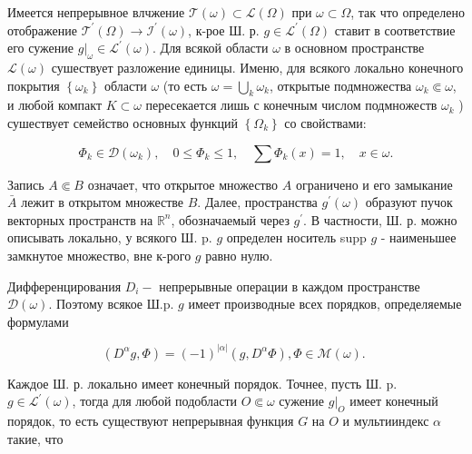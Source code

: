 \documentclass[10pt]{article}
\begin{document}
Имеется непрерывное влчжение $\mathscr{T}(\omega) \subset \mathscr{L}(\Omega)$ при $\omega \subset \Omega$, так что определено отображение $\mathscr{T}^{\prime}(\Omega) \rightarrow \mathscr{I}^{\prime}(\omega)$, к-рое Ш. р. $g \in \mathscr{L}^{\prime}(\Omega)$ ставит в соответствие его сужение $\left.g\right|_{\omega} \in \mathscr{L}^{\prime}(\omega)$. Для всякой области $\omega$ в основном пространстве $\mathscr{L}(\omega)$ сушествует разложение единицы. Именю, для всякого локально конечного покрытия $\left\{\omega_{k}\right\}$ области $\omega$ (то есть $\omega=\bigcup_{k} \omega_{k}$, открытые подмножества $\omega_{k} \Subset \omega$, и любой компакт $K \subset \omega$ пересекается лишь с конечным числом подмножеств $\omega_{k}$ ) сушествует семейство основных функций $\left\{\Omega_{k}\right\}$ со свойствами:



\[

\Phi_{k} \in \mathscr{D}\left(\omega_{k}\right), \quad 0 \leqslant \Phi_{k} \leqslant 1, \quad \sum \Phi_{k}(x)=1, \quad x \in \omega .

\]



Запись $A \Subset B$ означает, что открытое множество $A$ ограничено и его замыкание $\bar{A}$ лежит в открытом множестве $B$. Далее, пространства $g^{\prime}(\omega)$ образуют пучок векторных пространств на $\mathbb{R}^{n}$, обозначаемый через $g^{\prime}$. В частности, Ш. р. можно описывать локально, у всякого Ш. p. $g$ определен носитель supp $g$ - наименьшее замкнутое множество, вне к-рого $g$ равно нулю.



Дифференцирования $D_{i}-$ непрерывные операции в каждом пространстве $\mathscr{D}(\omega)$. Поэтому всякое Ш.p. $g$ имеет производные всех порядков, определяемые формулами



\[

\left(D^{\alpha} g, \Phi\right)=(-1)^{|\alpha|}\left(g, D^{\alpha} \Phi\right), \Phi \in \mathscr{M}(\omega) \text {. }

\]



Каждое Ш. р. локально имеет конечный порядок. Точнее, пусть Ш. p. $g \in \mathscr{L}^{\prime}(\omega)$, тогда для любой подобласти $O \Subset \omega$ сужение $\left.g\right|_{O}$ имеет конечный порядок, то есть существуют непрерывная функция $G$ на $O$ и мультииндекс $\alpha$ такие, что
\end{document}

